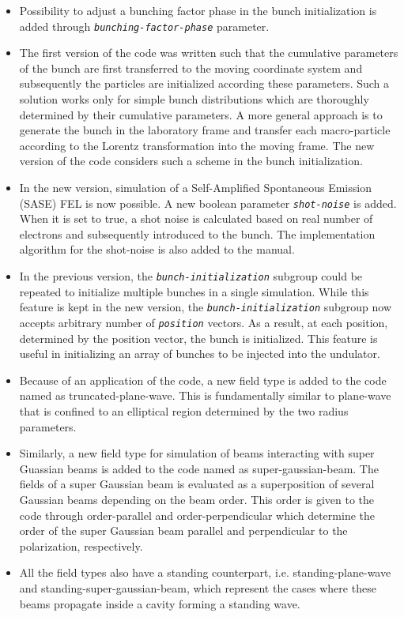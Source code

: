 \begin{itemize}
	\item Possibility to adjust a bunching factor phase in the bunch initialization is added through {\tt \small \em bunching-factor-phase} parameter.
	\item The first version of the code was written such that the cumulative parameters of the bunch are first transferred to the moving coordinate system and subsequently the particles are initialized according these parameters. Such a solution works only for simple bunch distributions which are thoroughly determined by their cumulative parameters. A more general approach is to generate the bunch in the laboratory frame and transfer each macro-particle according to the Lorentz transformation into the moving frame. The new version of the code considers such a scheme in the bunch initialization.
	\item In the new version, simulation of a Self-Amplified Spontaneous Emission (SASE) FEL is now possible. A new boolean parameter {\tt \small \em shot-noise} is added. When it is set to true, a shot noise is calculated based on real number of electrons and subsequently introduced to the bunch. The implementation algorithm for the shot-noise is also added to the manual.
	\item In the previous version, the {\tt \small \em bunch-initialization} subgroup could be repeated to initialize multiple bunches in a single simulation. While this feature is kept in the new version, the {\tt \small \em bunch-initialization} subgroup now accepts arbitrary number of {\tt \small \em position} vectors. As a result, at each position, determined by the position vector, the bunch is initialized. This feature is useful in initializing an array of bunches to be injected into the undulator.
	\item Because of an application of the code, a new field type is added to the code named as truncated-plane-wave. This is fundamentally similar to plane-wave that is confined to an elliptical region determined by the two radius parameters.
	\item Similarly, a new field type for simulation of beams interacting with super Guassian beams is added to the code named as super-gaussian-beam. The fields of a super Gaussian beam is evaluated as a superposition of several Gaussian beams depending on the beam order. This order is given to the code through order-parallel and order-perpendicular which determine the order of the super Gaussian beam parallel and perpendicular to the polarization, respectively.
	\item All the field types also have a standing counterpart, i.e. standing-plane-wave and standing-super-gaussian-beam, which represent the cases where these beams propagate inside a cavity forming a standing wave.

\end{itemize}

